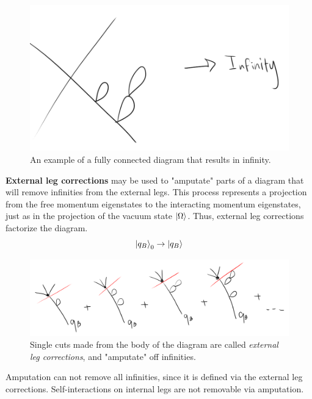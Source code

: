 \begin{figure}[H]
	\centering
	\includegraphics[scale=0.4]{images/fullconninf.png}
	\caption{An example of a fully connected diagram that results in infinity.}
\end{figure}

\noindent \textbf{External leg corrections} may be used to "amputate" parts of a diagram that will remove infinities from the external legs. This process represents a projection from the free momentum eigenstates to the interacting momentum eigenstates, just as in the projection of the vacuum state $\ket{\Omega}$. Thus, external leg corrections factorize the diagram. 
\begin{equation}
\ket{q_B}_0 \to \ket{q_B}
\end{equation}

\begin{figure}[H]
	\centering
	\includegraphics[scale=0.4]{images/extlegcorr.png}
	\caption{Single cuts made from the body of the diagram are called \textit{external leg corrections}, and "amputate" off infinities.}
\end{figure}

\noindent Amputation can not remove all infinities, since it is defined via the external leg corrections. Self-interactions on internal legs are not removable via amputation.


